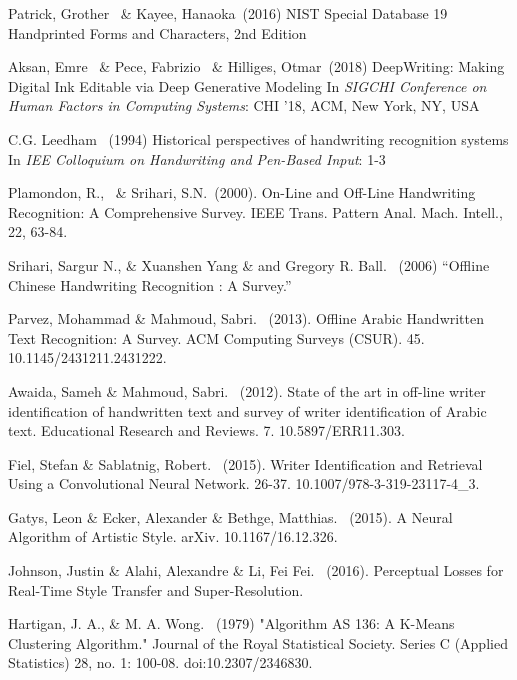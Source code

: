 \documentclass{article}
\begin{document}
\begin{thebibliography}{99} 
   Patrick, Grother \ \&  Kayee, Hanaoka\ (2016) NIST Special Database 19 Handprinted Forms and Characters, 2nd Edition
  
   Aksan, Emre \ \& Pece, Fabrizio \ \& Hilliges, Otmar\ (2018) DeepWriting: Making Digital Ink Editable via Deep Generative Modeling
  In {\itshape SIGCHI Conference on Human Factors in Computing Systems}: CHI '18, ACM, New York, NY, USA
  
   C.G. Leedham \ (1994) Historical perspectives of handwriting recognition systems 
  In {\itshape IEE Colloquium on Handwriting and Pen-Based Input}: 1-3
  
   Plamondon, R., \ \& Srihari, S.N.\ (2000). 
  On-Line and Off-Line Handwriting Recognition: A Comprehensive Survey. IEEE Trans. Pattern Anal. Mach. Intell., 22, 63-84.

   Srihari, Sargur N., \& Xuanshen Yang \& and Gregory R. Ball. \ (2006) “Offline Chinese Handwriting Recognition : A Survey.”

   Parvez, Mohammad \&  Mahmoud, Sabri. \ (2013). Offline Arabic Handwritten Text Recognition: A Survey. ACM Computing Surveys (CSUR). 45. 10.1145/2431211.2431222. 

   Awaida, Sameh \& Mahmoud, Sabri. \ (2012). State of the art in off-line writer identification of handwritten text and survey of writer identification of Arabic text. Educational Research and Reviews. 7. 10.5897/ERR11.303. 

   Fiel, Stefan \& Sablatnig, Robert. \ (2015). Writer Identification and Retrieval Using a Convolutional Neural Network. 26-37. 10.1007/978-3-319-23117-4\_3. 

   Gatys, Leon \& Ecker, Alexander \& Bethge, Matthias. \ (2015). A Neural Algorithm of Artistic Style. arXiv. 10.1167/16.12.326. 

   Johnson, Justin \& Alahi, Alexandre \& Li, Fei Fei. \ (2016). Perceptual Losses for Real-Time Style Transfer and Super-Resolution. 

   Hartigan, J. A., \& M. A. Wong. \ (1979) "Algorithm AS 136: A K-Means Clustering Algorithm." Journal of the Royal Statistical Society. Series C (Applied Statistics) 28, no. 1: 100-08. doi:10.2307/2346830.


\end{thebibliography}
\end{document}
